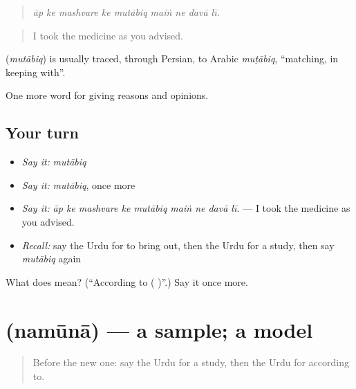 \begin{quote}
\emph{āp ke mashvare ke mutābiq maiṅ ne davā lī.}
\end{quote}

\begin{quote}
I took the medicine as you advised.
\end{quote}

\begin{cousinweb}
\textbf{} (\emph{mutābiq}) is usually traced, through Persian, to Arabic \emph{muṭābiq}, \textquotedblleft{}matching, in keeping with\textquotedblright{}.
\end{cousinweb}

\begin{grammarlens}[title={What you've built}]
One more word for giving reasons and opinions.
\end{grammarlens}

\subsection*{Your turn}
\begin{itemize}
\raggedright
  \item \emph{Say it:} \emph{mutābiq}
  \item \emph{Say it:} \emph{mutābiq}, once more
  \item \emph{Say it:} \emph{āp ke mashvare ke mutābiq maiṅ ne davā lī.} — I took the medicine as you advised.
  \item \emph{Recall:} say the Urdu for to bring out, then the Urdu for a study, then say \emph{mutābiq} again
\end{itemize}

\begin{tcolorbox}[breakable,colback=teal!4,colframe=teal!35!black,title={Before you move on}]
What does  mean? (\textquotedblleft{}According to ( )\textquotedblright{}.) Say it once more.
\end{tcolorbox}
\section[\texorpdfstring{\ur{نمونہ} (namūnā)}{نمونہ (namūnā)}]{ (namūnā) — a sample; a model}

\label{lesson:UR-C351-namuna}



\begin{quote}
Before the new one: say the Urdu for a study, then the Urdu for according to.
\end{quote}


